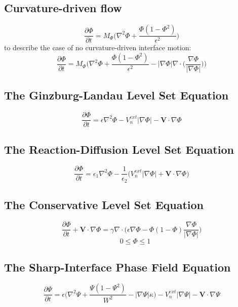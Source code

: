 \documentclass[12pt]{extarticle}
\begin{document}
\subsection*{Curvature-driven flow}
\begin{equation}
\frac{\partial\Phi}{\partial t}  = M_{\Phi} \Big( \nabla^{2} \Phi + \frac{\Phi (1 - \Phi^{2})}{\epsilon^{2}} \Big)
\end{equation}
to describe the case of no curvature-driven interface motion:
\begin{equation}
\frac{\partial\Phi}{\partial t}  = M_{\Phi} \Big( \nabla^{2} \Phi + \frac{\Phi (1 - \Phi^{2})}{\epsilon^{2}}  - | \nabla \Phi| \nabla \cdot  \Big(\frac{\nabla \Phi}{| \nabla \Phi|} \Big) \Big)
\end{equation}

\subsection*{The Ginzburg-Landau Level Set Equation}
\begin{equation}
\frac{\partial\Phi}{\partial t} = \epsilon \nabla^{2} \Phi - V_{n}^{ext}|\nabla \Phi | - \textbf{V} \cdot  \nabla \Phi
\label{eqVLS3} 
\end{equation}

\subsection*{The Reaction-Diffusion Level Set Equation}
\begin{equation}
\frac{\partial\Phi}{\partial t} = \epsilon_{1} \nabla^{2} \Phi - \frac{1}{\epsilon_{2}} \Big( V_{n}^{ext}|\nabla \Phi | + \textbf{V} \cdot  \nabla \Phi \Big)
\label{phasefield2}
\end{equation}

\subsection*{The Conservative Level Set Equation}
\begin{equation}
\frac{\partial\Phi}{\partial t} + \textbf{V} \cdot \nabla \Phi = \gamma \nabla \cdot \Big( \epsilon \nabla \Phi - \Phi(1-\Phi) \frac{\nabla \Phi}{|\nabla \Phi|} \Big)
\label{phasefield2}
\end{equation}
\begin{equation}
\quad 0 \leq \Phi \leq 1
\end{equation}

\subsection*{The Sharp-Interface Phase Field Equation}
\begin{equation}
\frac{\partial\Psi}{\partial t} = \epsilon \Big(\nabla^{2} \Psi + \frac{\Psi(1-\Psi^{2})}{W^{2}} - |\nabla \Psi| \kappa \Big)- V_{n}^{ext}|\nabla \Psi | - \textbf{V} \cdot \nabla \Psi
\label{sharpphasefield}
\end{equation}
\end{document}
